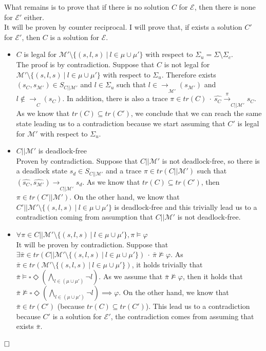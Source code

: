 \noindent
What remains is to prove that if there is no solution $C$ for $\mathcal{E}$, then there is none for $\mathcal{E'}$ either. \\
It will be proven by counter reciprocal. I will prove that, if exists a solution $C'$ for $\mathcal{E'}$, then $C$ is a solution for $\mathcal{E}$. 
\begin{itemize}
    \item $C$ is legal for $\mathcal{M'}\setminus \{ (s, l, s) \ | \ l \in \mu \cup \mu' \}$ with respect to $\Sigma_u = \Sigma \setminus \Sigma_c$. \\ 
    The proof is by contradiction. Suppose that $C$ is not legal for $\mathcal{M'} \setminus \{ (s, l, s) \ | \ l \in \mu \cup \mu' \}$ with respect to $\Sigma_u$. Therefore exists $(s_{C},s_{\mathcal{M'}})\in S_{C||\mathcal{M'}}$ and $l \in \Sigma_u$ such that $l \in \xrightarrow[]{}_{\mathcal{M'}}\!(s_{\mathcal{M'}})$ and $l \notin \xrightarrow[]{}_{C}\!(s_{C})$. In addition, there is also a trace $\pi \in tr(C) \ \cdot \ \hat{s_{C}} \xrightarrow[]{\pi}_{C||\mathcal{M'}} s_{C}$. As we know that $tr(C) \subseteq tr(C')$, we conclude that we can reach the same state leading us to a contradiction because we start assuming that $C'$ is legal for $\mathcal{M'}$ with respect to $\Sigma_u$.

    \item $C||\mathcal{M'}$ is deadlock-free\\ 
    Proven by contradiction. Suppose that $C || \mathcal{M'}$ is not deadlock-free, so there is a deadlock state $s_d \in S_{C||\mathcal{M'}}$ and a trace $\pi \in tr(C||\mathcal{M'})$ such that $(\hat{s_{C}},\hat{s_{\mathcal{M'}}}) \xrightarrow[]{}_{C||\mathcal{M'}} s_d$. As we know that $tr(C) \subseteq tr(C')$, then $\pi \in tr(C'||\mathcal{M'})$. On the other hand, we know that $C'||\mathcal{M'} \setminus \{ (s, l, s) \ | \ l \in \mu \cup \mu' \}$ is deadlock-free and this trivially lead us to a contradiction coming from assumption that $C || \mathcal{M'}$ is not deadlock-free.

    \item $\forall \pi \in C || \mathcal{M'} \setminus \{ (s, l, s) \ | \ l \in \mu \cup \mu' \},  \pi \vDash \varphi $ \\
    It will be proven by contradiction. Suppose that $\exists \bar{\pi} \in tr(C||\mathcal{M'} \setminus \{ (s, l, s) \ | \ l \in \mu \cup \mu' \}) \ \cdot \ \bar{\pi} \nvDash \varphi$. As $\bar{\pi} \in tr(\mathcal{M'} \setminus \{ (s, l, s) \ | \ l \in \mu \cup \mu' \})$, it holds trivially that $\bar{\pi} \vDash \square \Diamond (\bigwedge_{l \in (\mu \cup \mu')} \neg l)$. As we assume that $\bar{\pi} \nvDash  \varphi$, then it holds that $\bar{\pi} \nvDash \square \Diamond (\bigwedge_{l \in (\mu \cup \mu')} \neg l) \implies \varphi$.
    On the other hand, we know that $\bar{\pi}\in tr(C')$ (because $tr(C) \subseteq tr(C')$). This lead us to a contradiction because $C'$ is a solution for $\mathcal{E'}$, the contradiction comes from assuming that exists $\bar{\pi}$.
\end{itemize}
$\hfill \square$

